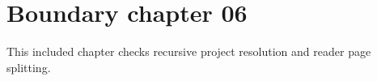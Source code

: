 \section{Boundary chapter 06}
\label{sec:boundary-06}
This included chapter checks recursive project resolution and reader page splitting.
